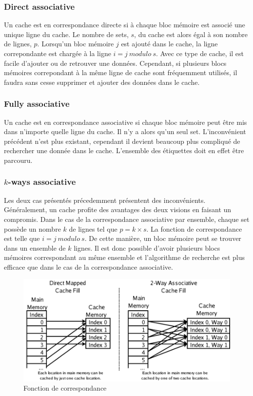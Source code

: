 \subsubsection{Direct associative}
Un cache est en correspondance directe si à chaque bloc mémoire est associé une unique ligne du cache. Le nombre de sets, $s$, du cache est alors égal à son nombre de lignes, $p$. Lorsqu'un bloc mémoire $j$ est ajouté dans le cache, la ligne correpondante est chargée à la ligne $i = j\ modulo\ s$. Avec ce type de cache, il est facile d'ajouter ou de retrouver une données. Cependant, si plusieurs blocs mémoires correpondant à la même ligne de cache sont fréquemment utilisés, il faudra sans cesse supprimer et ajouter des données dans le cache.

\subsubsection{Fully associative}
Un cache est en correspondance associative si chaque bloc mémoire peut être mis dans n'importe quelle ligne du cache. Il n'y a alors qu'un seul set. L'inconvénient précédent n'est plus existant, cependant il devient beaucoup plus compliqué de rechercher une donnée dans le cache. L'ensemble des étiquettes doit en effet être parcouru.

\subsubsection{$k$-ways associative}
Les deux cas présentés précedemment présentent des inconvénients. Généralement, un cache profite des avantages des deux visions en faisant un compromis. Dans le cas de la correspondance associative par ensemble, chaque set possède un nombre $k$ de lignes tel que $p=k \times s$. La fonction de correspondance est telle que $i = j\ modulo\ s$. De cette manière, un bloc mémoire peut se trouver dans un ensemble de $k$ lignes. Il est donc possible d'avoir plusieurs blocs mémoires correspondant au même ensemble et l'algorithme de recherche est plus efficace que dans le cas de la correspondance associative.

\begin{figure}[!h]
\begin{center}
   \includegraphics[scale=0.60]{images/associative.png}
   \caption{\label{img:associative} Fonction de correspondance}
\end{center}
\end{figure}

